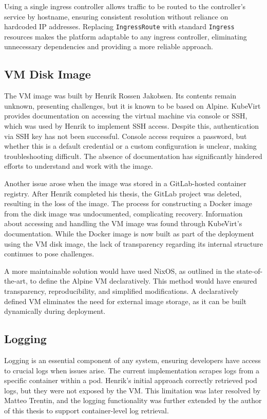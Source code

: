 Using a single ingress controller allows traffic to be routed to the controller's service by hostname, ensuring consistent resolution without reliance on hardcoded IP addresses. Replacing \texttt{IngressRoute} with standard \texttt{Ingress} resources makes the platform adaptable to any ingress controller, eliminating unnecessary dependencies and providing a more reliable approach.

\subsection{VM Disk Image}
The VM image was built by Henrik Rossen Jakobsen. Its contents remain unknown, presenting challenges, but it is known to be based on Alpine. KubeVirt provides documentation on accessing the virtual machine via console or SSH, which was used by Henrik to implement SSH access. Despite this, authentication via SSH key has not been successful. Console access requires a password, but whether this is a default credential or a custom configuration is unclear, making troubleshooting difficult. The absence of documentation has significantly hindered efforts to understand and work with the image.

Another issue arose when the image was stored in a GitLab-hosted container registry. After Henrik completed his thesis, the GitLab project was deleted, resulting in the loss of the image. The process for constructing a Docker image from the disk image was undocumented, complicating recovery. Information about accessing and handling the VM image was found through KubeVirt's documentation. While the Docker image is now built as part of the deployment using the VM disk image, the lack of transparency regarding its internal structure continues to pose challenges.

A more maintainable solution would have used NixOS, as outlined in the state-of-the-art, to define the Alpine VM declaratively. This method would have ensured transparency, reproducibility, and simplified modifications. A declaratively defined VM eliminates the need for external image storage, as it can be built dynamically during deployment.

\subsection{Logging} 
Logging is an essential component of any system, ensuring developers have access to crucial logs when issues arise. The current implementation scrapes logs from a specific container within a pod. Henrik's initial approach correctly retrieved pod logs, but they were not exposed by the VM. This limitation was later resolved by Matteo Trentin, and the logging functionality was further extended by the author of this thesis to support container-level log retrieval.

